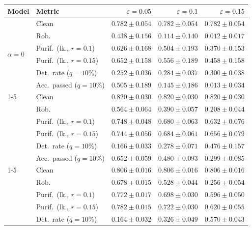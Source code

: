 \begin{table}[htbp]
  \centering
  \small
  \begin{tabular}{@{}llrrr@{}}
    \toprule
    Model & Metric & $\varepsilon=0.05$ & $\varepsilon=0.1$ & $\varepsilon=0.15$ \\
    \midrule
    \multirow{6}{*}{$\alpha{=}0$} & Clean & $0.782 \pm 0.054$ & $0.782 \pm 0.054$ & $0.782 \pm 0.054$ \\
     & Rob. & $0.438 \pm 0.156$ & $0.114 \pm 0.140$ & $0.012 \pm 0.017$ \\
     & Purif.\ (lk., $r{=}0.1$) & $0.626 \pm 0.168$ & $0.504 \pm 0.193$ & $0.370 \pm 0.153$ \\
     & Purif.\ (lk., $r{=}0.15$) & $0.652 \pm 0.158$ & $0.556 \pm 0.189$ & $0.458 \pm 0.158$ \\
     & Det.\ rate ($q{=}10\%$) & $\mathbf{0.252 \pm 0.036}$ & $0.284 \pm 0.037$ & $0.300 \pm 0.038$ \\
     & Acc.\ passed ($q{=}10\%$) & $0.505 \pm 0.189$ & $0.145 \pm 0.186$ & $0.013 \pm 0.034$ \\
    \cmidrule(lr){1-5}
    \multirow{6}{*}{$\alpha{=}0.01$} & Clean & $0.820 \pm 0.030$ & $0.820 \pm 0.030$ & $0.820 \pm 0.030$ \\
     & Rob. & $0.564 \pm 0.064$ & $0.390 \pm 0.057$ & $0.208 \pm 0.044$ \\
     & Purif.\ (lk., $r{=}0.1$) & $0.748 \pm 0.048$ & $0.680 \pm 0.063$ & $\mathbf{0.632 \pm 0.076}$ \\
     & Purif.\ (lk., $r{=}0.15$) & $0.744 \pm 0.056$ & $0.684 \pm 0.061$ & $\mathbf{0.656 \pm 0.079}$ \\
     & Det.\ rate ($q{=}10\%$) & $0.166 \pm 0.033$ & $0.278 \pm 0.071$ & $0.476 \pm 0.157$ \\
     & Acc.\ passed ($q{=}10\%$) & $0.652 \pm 0.059$ & $0.480 \pm 0.093$ & $0.299 \pm 0.085$ \\
    \cmidrule(lr){1-5}
    \multirow{6}{*}{$\alpha{=}0.1$} & Clean & $0.806 \pm 0.016$ & $0.806 \pm 0.016$ & $0.806 \pm 0.016$ \\
     & Rob. & $\mathbf{0.678 \pm 0.015}$ & $\mathbf{0.528 \pm 0.044}$ & $\mathbf{0.256 \pm 0.054}$ \\
     & Purif.\ (lk., $r{=}0.1$) & $\mathbf{0.772 \pm 0.017}$ & $\mathbf{0.698 \pm 0.030}$ & $0.596 \pm 0.050$ \\
     & Purif.\ (lk., $r{=}0.15$) & $\mathbf{0.782 \pm 0.015}$ & $\mathbf{0.722 \pm 0.030}$ & $0.620 \pm 0.055$ \\
     & Det.\ rate ($q{=}10\%$) & $0.164 \pm 0.032$ & $0.326 \pm 0.049$ & $0.570 \pm 0.043$ \\

\end{tabular}
\end{table}
